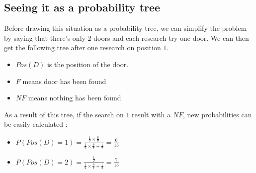 \documentclass{article}
\begin{document}
\subsection{Seeing it as a probability tree}
Before drawing this situation as a probability tree, we can simplify the
problem by saying that there's only 2 doors and each research try one door.
We can then get the following tree after one research on position $1$.
\begin{itemize}
\item $Pos(D)$ is the position of the door.
\item $F$ means door has been found
\item $NF$ means nothing has been found
\end{itemize}
\begin{center}
\end{center}

As a result of this tree, if the search on $1$ result with a $NF$, new
probabilities can be easily calculated :
\begin{itemize}
\item $P(Pos(D) = 1) = \frac{\frac{1}{2} \times \frac{6}{7}}
                            {\frac{1}{2} \times \frac{6}{7} +
                             \frac{1}{2}}
                     = \frac{6}{13}$
\item $P(Pos(D) = 2) = \frac{\frac{1}{2}}
                            {\frac{1}{2} \times \frac{6}{7} +
                             \frac{1}{2}}
                     = \frac{7}{13}$
\end{itemize}
\end{document}
